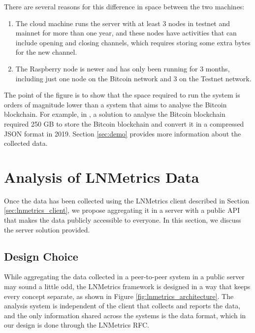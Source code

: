 There are several reasons for this difference in space between the two machines:

\begin{enumerate}
  \item The cloud machine runs the server with at least 3 nodes in testnet and mainnet for more
        than one year, and these nodes have activities that can include opening and closing channels,
        which requires storing some extra bytes for the new channel.
  \item The Raspberry node is newer and has only been running for 3 months, including just one node on
        the Bitcoin network and 3 on the Testnet network.
\end{enumerate}

The point of the figure is to show that the space required to run the system is
orders of magnitude lower than a system that aims to analyse the Bitcoin blockchain.
For example, in \cite{Palazzo_Estrazione_di_Informazioni_2021}, a solution to analyse the Bitcoin blockchain
required 250 GB to store the Bitcoin blockchain and convert it in a compressed JSON format in 2019.
Section \ref{sec:demo} provides more information about the collected data.

\section{Analysis of LNMetrics Data}
\label{sec:lnmetrics_server}

Once the data has been collected using the LNMetrics client described in 
Section \ref{sec:lnmetrics_client}, we propose aggregating it in a server with 
a public API that makes the data publicly accessible to everyone. In this 
section, we discuss the server solution provided.

\subsection{Design Choice}

While aggregating the data collected in a peer-to-peer system in a public 
server may sound a little odd, the LNMetrics framework is designed in a way 
that keeps every concept separate, as shown in Figure \ref{fig:lnmetrics_architecture}. 
The analysis system is independent of the client that collects and reports the data, and
the only information shared across the systems is the data format, which in our
design is done through the LNMetrics RFC.

